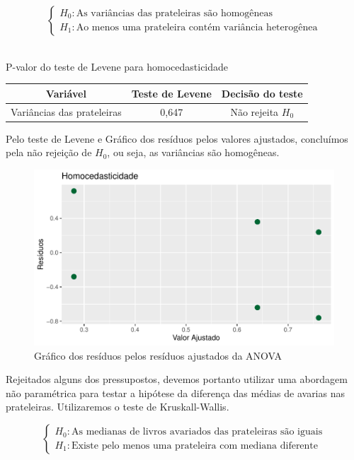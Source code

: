 \documentclass[a4paper, 12pt]{article}
\begin{document}
$$\begin{cases}
H_0 : \mbox{As variâncias das prateleiras são homogêneas}\\
H_1 : \mbox{Ao menos uma prateleira contém variância heterogênea}
\end{cases}$$\\

\begin{quadro}[H]
\centering
\caption{P-valor do teste de Levene para homocedasticidade}
\begin{tabular}{|c|c|c|}
\hline
\textbf{Variável} & \textbf{Teste de Levene} & \textbf{Decisão do teste} \\ \hline Variâncias das prateleiras
 &  0,647       & Não rejeita $H_0$  \\ \hline  
\end{tabular}
\end{quadro}

Pelo teste de Levene e Gráfico dos resíduos pelos valores ajustados, concluímos pela não rejeição de $H_0$, ou seja, as variâncias são homogêneas.

\begin{figure}[H]
    \centering
    \caption{Gráfico dos resíduos pelos resíduos ajustados da ANOVA}
    \includegraphics[scale=1]{grafico8.pdf}
\end{figure}

\newpage

Rejeitados alguns dos pressupostos, devemos portanto utilizar uma abordagem não paramétrica para testar a hipótese da diferença das médias de avarias nas prateleiras. Utilizaremos o teste de Kruskall-Wallis.

$$\begin{cases}
H_0 : \mbox{As medianas de livros avariados das prateleiras são iguais}\\
H_1 : \mbox{Existe pelo menos uma prateleira com mediana diferente}
\end{cases}$$\\
\end{document}
